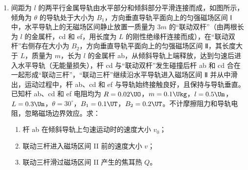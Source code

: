 \documentclass[\gkver]{gaokaozhenti}
\begin{document}
\begin{enumerate}
{figs/21b2.png}
{figs/21b3.png}
{figs/21b4.png}


\item
间距为 $l$ 的两平行金属导轨由水平部分和倾斜部分平滑连接而成，如图所示，倾角为 $\theta$ 的导轨处于大小为 $B_{1}$，方向垂直导轨平面向上的匀强磁场区间 Ⅰ 中，水平导轨上的无磁场区间静止放置一质量为 $3m$ 的“联动双杆”（由两根长为 $l$ 的金属杆，cd 和 ef，用长度为 $L$ 的刚性绝缘杆连接而成），在“联动双杆”右侧存在大小为 $B_{2}$，方向垂直导轨平面向上的匀强磁场区间 Ⅱ，其长度大于 $L$，质量为 $m$，长为 $l$ 的金属杆 ab，从倾斜导轨上端释放，达到匀速后进入水平导轨（无能量损失），杆 cd 与“联动双杆”发生碰撞后杆 ab 和 cd 合在一起形成“联动三杆”，“联动三杆”继续沿水平导轨进入磁场区间 Ⅱ 并从中滑出，运动过程中，杆 ab、cd 和 ef 与导轨始终接触良好，且保持与导轨垂直。已知杆 ab、cd 和 ef 电阻均为 $R=0.02\UO$，$m=0.1\Ukg$，$l=0.5\Um$，$L=0.3\Um$，$\theta=30^\circ$，$B_{1}=0.1\UT$，$B_{2}=0.2\UT$。不计摩擦阻力和导轨电阻，忽略磁场边界效应。求：

\begin{enumerate}
	\item
	杆 ab 在倾斜导轨上匀速运动时的速度大小 $v_{0}$；
	\item
	联动三杆进入磁场区间 II 前的速度大小 $v$；
	\item
	联动三杆滑过磁场区间 II 产生的焦耳热 $Q$。
\end{enumerate}


\end{enumerate}
\end{document}
